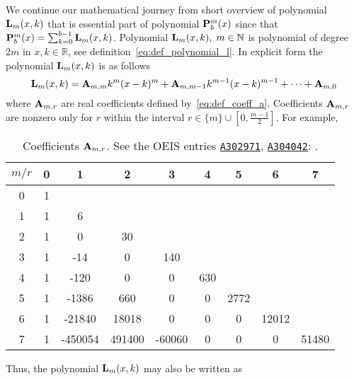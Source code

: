 \label{sec:polynomial-p-and-their-properties}
We continue our mathematical journey from short overview of polynomial ${\mathbf{L}}\sb{m}(x,k)$ that is
essential part of polynomial ${\mathbf{P}}\sp{m} \sb{b}(x)$ since that
${\mathbf{P}}\sp{m} \sb{b}(x) = \sum_{k=0}^{b-1} {\mathbf{L}}\sb{m}(x,k)$.
Polynomial ${\mathbf{L}}\sb{m}(x,k), \; m\in\mathbb{N}$ is polynomial of degree $2m$ in $x,k\in\mathbb{R}$,
see definition~\eqref{eq:def_polynomial_l}.
In explicit form the polynomial ${\mathbf{L}}\sb{m}(x,k)$ is as follows
\begin{equation*}
    {\mathbf{L}}\sb{m}(x,k) =
    {\mathbf{A}} \sb{m,m} k^m(x-k)^m +
    {\mathbf{A}} \sb{m,m-1} k^{m-1}(x-k)^{m-1} +
    \cdots +
    {\mathbf{A}} \sb{m,0}
\end{equation*}
where ${\mathbf{A}} \sb{m,r}$ are real coefficients defined by~\eqref{eq:def_coeff_a}.
Coefficients ${\mathbf{A}} \sb{m,r}$ are nonzero only for $r$ within the interval $r \in \{m\} \cup \left[0,\frac{m-1}{2}\right]$.
For example,
\begin{table}[H]
    \setlength\extrarowheight{-6pt}
    \begin{tabular}{c|cccccccc}
        $m/r$ & 0 & 1       & 2      & 3      & 4   & 5    & 6     & 7     \\
        \hline
        0     & 1 &         &        &        &     &      &       &       \\
        1     & 1 & 6       &        &        &     &      &       &       \\
        2     & 1 & 0       & 30     &        &     &      &       &       \\
        3     & 1 & -14     & 0      & 140    &     &      &       &       \\
        4     & 1 & -120    & 0      & 0      & 630 &      &       &       \\
        5     & 1 & -1386   & 660    & 0      & 0   & 2772 &       &       \\
        6     & 1 & -21840  & 18018  & 0      & 0   & 0    & 12012 &       \\
        7     & 1 & -450054 & 491400 & -60060 & 0   & 0    & 0     & 51480
    \end{tabular}
    \caption{Coefficients ${\mathbf{A}} \sb{m,r}$. See the OEIS entries
    \href{https://oeis.org/A302971}{\texttt{A302971}},
        \href{https://oeis.org/A304042}{\texttt{A304042}}: \cite{kolosov2018numerator, kolosov2018denominator}.}
    \label{tab:table_of_coefficients_a}
\end{table}
Thus, the polynomial ${\mathbf{L}}\sb{m}(x,k)$ may also be written as
